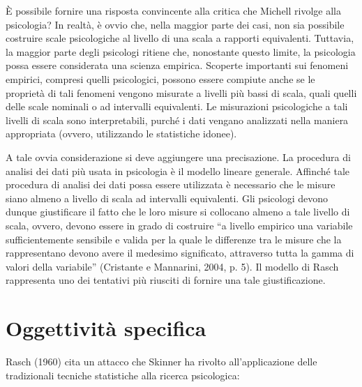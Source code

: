 È possibile fornire una risposta convincente alla critica che Michell rivolge alla psicologia? In realtà, è ovvio che, nella maggior parte dei casi, non sia possibile costruire scale psicologiche al livello di una scala a rapporti equivalenti. Tuttavia, la maggior parte degli psicologi ritiene che, nonostante questo limite, la psicologia possa  essere considerata  una scienza empirica. Scoperte importanti sui fenomeni empirici, compresi quelli psicologici, possono essere compiute anche se le proprietà di tali fenomeni vengono misurate a livelli più bassi di scala, quali quelli delle scale nominali o ad intervalli equivalenti. Le misurazioni psicologiche a tali livelli di scala sono interpretabili, purché i dati vengano  analizzati nella maniera appropriata (ovvero, utilizzando le statistiche idonee). 

A tale ovvia considerazione si deve aggiungere una precisazione. La procedura di analisi dei dati più usata in psicologia è il modello lineare generale. Affinché tale procedura di analisi dei dati possa essere utilizzata è necessario che le misure siano almeno a livello di scala ad intervalli equivalenti. Gli psicologi devono dunque giustificare il fatto che le loro misure si collocano almeno a tale  livello di  scala, ovvero, devono essere in grado di costruire ``a livello empirico una variabile sufficientemente sensibile e valida per la quale le differenze tra le misure che la rappresentano devono avere il medesimo significato, attraverso tutta la gamma di valori della variabile'' (Cristante e Mannarini, 2004, p. 5). Il modello di Rasch rappresenta uno dei tentativi più riusciti di fornire una tale giustificazione. 

\section{Oggettività specifica}

Rasch (1960) cita un attacco che Skinner ha rivolto all'applicazione delle tradizionali tecniche statistiche alla ricerca psicologica:

